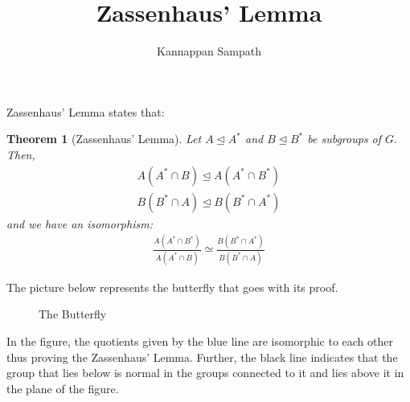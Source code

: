 \documentclass{amsart}
\title{Zassenhaus' Lemma}
\author{Kannappan Sampath}
\newtheorem*{theorem}{Theorem}
\begin{document}
\maketitle
Zassenhaus' Lemma states that: 
\begin{theorem}[Zassenhaus' Lemma] 
Let $A \unlhd A^\ast$ and $B \unlhd B^\ast$ be subgroups of $G.$ Then, 
\begin{align}
A(A^\ast \cap B) \unlhd A(A^\ast \cap B^\ast) \\
B(B^\ast \cap A) \unlhd B(B^\ast \cap A^\ast) 
\end{align}
and we have an isomorphism: 
\begin{align}
\frac{A(A^\ast \cap B^\ast)}{A(A^\ast \cap B)} \simeq \frac{B(B^\ast \cap A^\ast)}{B(B^\ast \cap A)}
\end{align}
\end{theorem}
The picture below represents the butterfly that goes with its proof.

\begin{figure}[h!]
\caption{The Butterfly}
\end{figure}

In the figure, the quotients given by the blue line are isomorphic to each other thus proving the Zassenhaus' Lemma. Further, the black line indicates that the group that lies below is normal in the groups connected to it and lies above it in the plane of the figure. 
\end{document}

